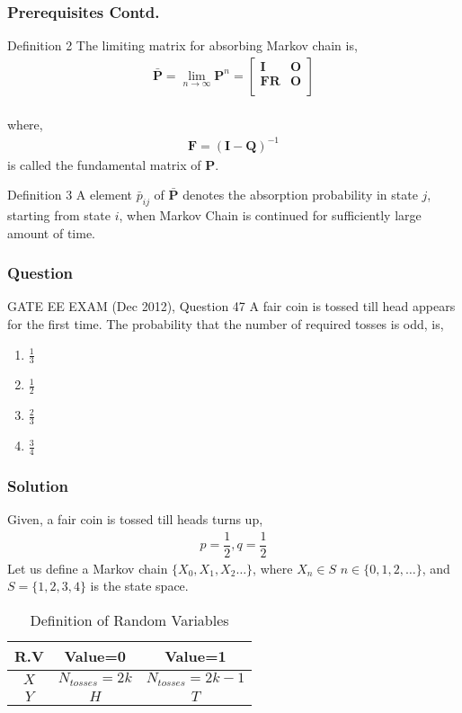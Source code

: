 \documentclass{beamer}
\renewcommand{\vec}[1]{\mathbf{#1}}
\let\vec\mathbf
\begin{document}
\begin{frame}
    \frametitle{Prerequisites Contd.}
    \begin{block}{Definition 2}
      The limiting matrix for absorbing Markov chain is,
\begin{align}
    \vec{\bar P}= \lim_{n\to\infty} \vec P^{n} =\begin{bmatrix}
    \vec{I} & \vec{O}\\
    \vec{FR} & \vec{O}\\
    \end{bmatrix}
    \label{eq4}
\end{align}
\\where,
\begin{align}
    \vec{F}=(\vec{I}-\vec{Q})^{-1}
    \label{eq5}
\end{align}
is called the fundamental matrix of $\vec{P}$. \\
    \end{block}
    \begin{block}{Definition 3}
A element $\bar p_{ij}$ of $\vec{\bar P}$ denotes the absorption probability in state $j$, starting from state $i$, when Markov Chain is continued for sufficiently large amount of time.
\end{block}
\end{frame}
\begin{frame}
    \frametitle{Question}
    \begin{block}{GATE EE EXAM (Dec 2012), Question 47}
   A fair coin is tossed till head appears for the first time. The probability that the number of required tosses is odd, is, \\
\begin{enumerate}
    \item $\frac{1}{3}$
    \item $\frac{1}{2}$
    \item $\frac{2}{3}$
    \item $\frac{3}{4}$
\end{enumerate}
  \end{block}
\end{frame}
\begin{frame}
\frametitle{Solution}
    Given, a fair coin is tossed till heads turns up,
\begin{align}
p=\dfrac{1}{2},q=\dfrac{1}{2}
\label{eq6}
\end{align}
    Let us define a Markov chain $\{X_{0},X_{1},X_{2}\dots\}$, where $X_{n}\in S$ \vee $n\in\{0,1,2,\dots\}$, and $S=\{1,2,3,4\}$ is the state space.
   \begin{table}[h!]
\centering
\caption{Definition of Random Variables}
\label{table:1}
\begin{tabular}{|c|c|c|}
    \hline
    R.V & Value=0 & Value=1 \\
    \hline
    $X$ & $N_{tosses}=2k$ & $N_{tosses}=2k-1$ \\[1ex]
    \hline
    $Y$ & $H$ & $T$ \\[1ex]
    \hline
\end{tabular}
\end{table}    
\end{frame}
\end{document}
